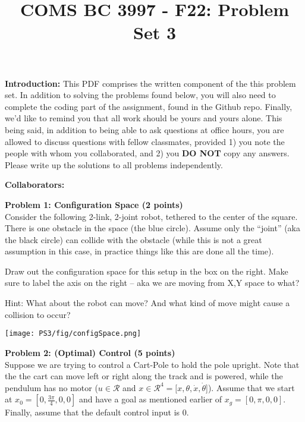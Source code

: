 \documentclass[]{article}
\title{COMS BC 3997 - F22: Problem Set 3}
\author{
}
\date{}
\begin{document}
\maketitle %

\textbf{Introduction:}  
This PDF comprises the written component of the this problem set.  In addition to solving the problems found below, you will also need to complete the coding part of the assignment, found in the Github repo. Finally, we'd like to remind you that all work should be yours and yours alone. This being said, in addition to being able to ask questions at office hours, you are allowed to discuss questions with fellow classmates, provided 1) you note the people with whom you collaborated, and 2) you \textbf{DO NOT} copy any answers. Please write up the solutions to all problems independently.

\bigskip
\textbf{Collaborators:}

\clearpage
\textbf{Problem 1: Configuration Space (2 points)}\\
Consider the following 2-link, 2-joint robot, tethered to the center of the square. There is one obstacle in the space (the blue circle). Assume only the ``joint'' (aka the black circle) can collide with the obstacle (while this is not a great assumption in this case, in practice things like this are done all the time). 

Draw out the configuration space for this setup in the box on the right. Make sure to label the axis on the right -- aka we are moving from X,Y space to what?

Hint: What about the robot can move? And what kind of move might cause a collision to occur?

\bigskip
\texttt{[image: PS3/fig/configSpace.png]}

\clearpage
\textbf{Problem 2: (Optimal) Control (5 points)}\\
Suppose we are trying to control a Cart-Pole to hold the pole upright. Note that the the cart can move left or right along the track and is powered, while the pendulum has no motor ($u \in \mathcal{R}$ and $x\in \mathcal{R}^4 = [x,\theta,\dot{x},\dot{\theta}$]). Assume that we start at $x_0 = [0,\frac{3\pi}{4},0,0]$ and have a goal as mentioned earlier of $x_g = [0,\pi,0,0]$. Finally, assume that the default control input is $0$.
\end{document}
